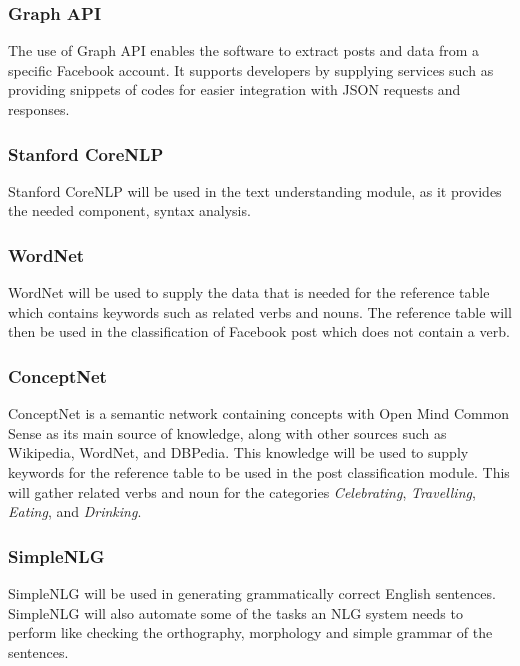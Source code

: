 \subsubsection{Graph API}
The use of Graph API enables the software to extract posts and data from a specific Facebook account. It supports developers by supplying services such as providing snippets of codes for easier integration with JSON requests and responses.

\subsubsection{Stanford CoreNLP}
Stanford CoreNLP will be used in the text understanding module, as it provides the needed component, syntax analysis. 

\subsubsection{WordNet}
WordNet will be used to supply the data that is needed for the reference table which contains keywords such as related verbs and nouns. The reference table will then be used in the classification of Facebook post which does not contain a verb.

\subsubsection{ConceptNet}
ConceptNet is a semantic network containing concepts with Open Mind Common Sense as its main source of knowledge, along with other sources such as Wikipedia, WordNet, and DBPedia. This knowledge will be used to supply keywords for the reference table to be used in the post classification module. This will gather related verbs and noun for the categories \textit{Celebrating}, \textit{Travelling}, \textit{Eating}, and \textit{Drinking}.

\subsubsection{SimpleNLG}
SimpleNLG will be used in generating grammatically correct English sentences. SimpleNLG will also automate some of the tasks an NLG system needs to perform like checking the orthography, morphology and simple grammar of the sentences.